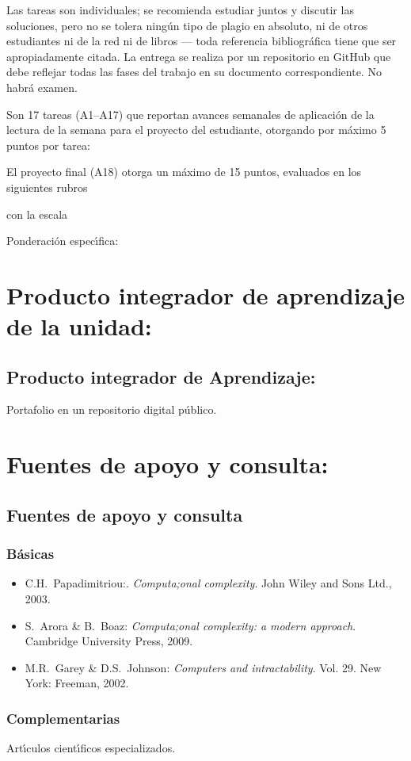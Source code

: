 \documentclass[10 pt]{article}
\begin{document}
Las tareas son individuales; se recomienda estudiar juntos y discutir
las soluciones, pero no se tolera ning\'{u}n tipo de plagio en
absoluto, ni de otros estudiantes ni de la red ni de libros --- toda
referencia bibliogr\'{a}fica tiene que ser apropiadamente citada. La
entrega se realiza por un repositorio en GitHub que debe reflejar
todas las fases del trabajo en su documento correspondiente.  No
habr\'{a} examen.

Son 17 tareas (A1--A17) que reportan avances semanales de aplicaci\'{o}n
de la lectura de la semana para el proyecto del estudiante,
otorgando por m\'{a}ximo 5 puntos por tarea:

El proyecto final (A18) otorga un m\'{a}ximo de 15 puntos, evaluados en los
siguientes rubros

con la escala


Ponderaci\'{o}n espec\'{\i}fica:



\newpage

\section{Producto integrador de aprendizaje de la unidad:}
\subsection{Producto integrador de Aprendizaje:} Portafolio en un repositorio digital p\'{u}blico.

\section{Fuentes de apoyo y consulta:}
\subsection{Fuentes de apoyo y consulta}
\subsubsection{B\'{a}sicas}

\begin{itemize}[itemsep=0em]
  
\item{C.H.\ {\sc Papadimitriou}:. {\em Computa;onal complexity}. John
    Wiley and Sons Ltd., 2003.}
  
\item{S.\ {\sc Arora} \& B.\ {\sc Boaz}: {\em Computa;onal complexity:
      a modern approach}. Cambridge University Press, 2009.}
  
\item{M.R.\ {\sc Garey} \& D.S.\ {\sc Johnson}: {\em Computers and
      intractability}. Vol. 29. New York: Freeman, 2002.}
  
\end{itemize}

\subsubsection{Complementarias}

Art\'{\i}culos cient\'{\i}ficos especializados.
  
\label{final} %


\end{document}
